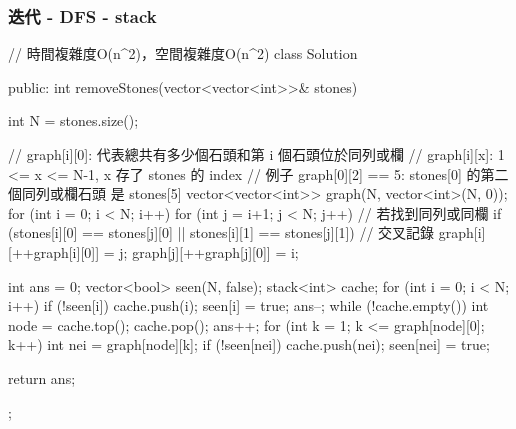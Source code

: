 \subsubsection{迭代 - DFS - stack}
\begin{Code}
// 時間複雜度O(n^2)，空間複雜度O(n^2)
class Solution {
public:
    int removeStones(vector<vector<int>>& stones) {
        int N = stones.size();

        // graph[i][0]: 代表總共有多少個石頭和第 i 個石頭位於同列或欄
        // graph[i][x]: 1 <= x <= N-1, x 存了 stones 的 index
        // 例子 graph[0][2] == 5: stones[0] 的第二個同列或欄石頭 是 stones[5]
        vector<vector<int>> graph(N, vector<int>(N, 0));
        for (int i = 0; i < N; i++)
        {
            for (int j = i+1; j < N; j++)
            {
                // 若找到同列或同欄
                if (stones[i][0] == stones[j][0]
                   || stones[i][1] == stones[j][1])
                {
                    // 交叉記錄
                    graph[i][++graph[i][0]] = j;
                    graph[j][++graph[j][0]] = i;
                }
            }
        }

        int ans = 0;
        vector<bool> seen(N, false);
        stack<int> cache;
        for (int i = 0; i < N; i++)
        {
            if (!seen[i])
            {
                cache.push(i);
                seen[i] = true;
                ans--;
                while (!cache.empty())
                {
                    int node = cache.top();
                    cache.pop();
                    ans++;
                    for (int k = 1; k <= graph[node][0]; k++)
                    {
                        int nei = graph[node][k];
                        if (!seen[nei])
                        {
                            cache.push(nei);
                            seen[nei] = true;
                        }
                    }
                }
            }
        }

        return ans;
    }
};
\end{Code}

